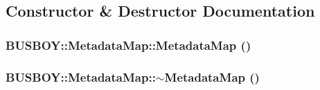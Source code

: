 \subsection{Constructor \& Destructor Documentation}
\hypertarget{classBUSBOY_1_1MetadataMap_aa0a5a676c07777bfc8b19d15759d2dd0}{
\subsubsection[{MetadataMap}]{\setlength{\rightskip}{0pt plus 5cm}BUSBOY::MetadataMap::MetadataMap ()}}
\label{classBUSBOY_1_1MetadataMap_aa0a5a676c07777bfc8b19d15759d2dd0}
\hypertarget{classBUSBOY_1_1MetadataMap_a8ddf080620bd9557052be4f69c41ca19}{
\subsubsection[{$\sim$MetadataMap}]{\setlength{\rightskip}{0pt plus 5cm}BUSBOY::MetadataMap::$\sim$MetadataMap ()}}
\label{classBUSBOY_1_1MetadataMap_a8ddf080620bd9557052be4f69c41ca19}


